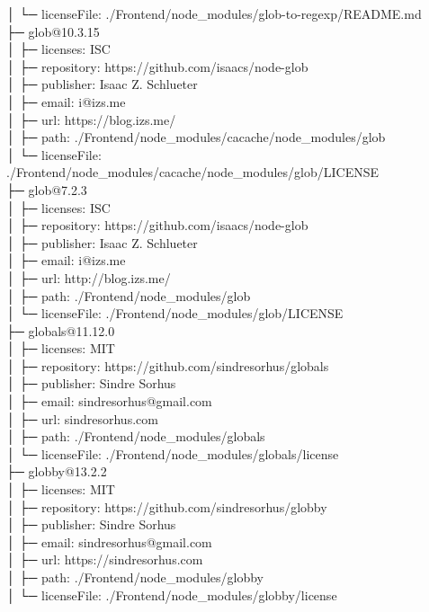 │  └─ licenseFile: ./Frontend/node\_modules/glob-to-regexp/README.md\\
├─ glob@10.3.15\\
│  ├─ licenses: ISC\\
│  ├─ repository: https://github.com/isaacs/node-glob\\
│  ├─ publisher: Isaac Z. Schlueter\\
│  ├─ email: i@izs.me\\
│  ├─ url: https://blog.izs.me/\\
│  ├─ path: ./Frontend/node\_modules/cacache/node\_modules/glob\\
│  └─ licenseFile: ./Frontend/node\_modules/cacache/node\_modules/glob/LICENSE\\
├─ glob@7.2.3\\
│  ├─ licenses: ISC\\
│  ├─ repository: https://github.com/isaacs/node-glob\\
│  ├─ publisher: Isaac Z. Schlueter\\
│  ├─ email: i@izs.me\\
│  ├─ url: http://blog.izs.me/\\
│  ├─ path: ./Frontend/node\_modules/glob\\
│  └─ licenseFile: ./Frontend/node\_modules/glob/LICENSE\\
├─ globals@11.12.0\\
│  ├─ licenses: MIT\\
│  ├─ repository: https://github.com/sindresorhus/globals\\
│  ├─ publisher: Sindre Sorhus\\
│  ├─ email: sindresorhus@gmail.com\\
│  ├─ url: sindresorhus.com\\
│  ├─ path: ./Frontend/node\_modules/globals\\
│  └─ licenseFile: ./Frontend/node\_modules/globals/license\\
├─ globby@13.2.2\\
│  ├─ licenses: MIT\\
│  ├─ repository: https://github.com/sindresorhus/globby\\
│  ├─ publisher: Sindre Sorhus\\
│  ├─ email: sindresorhus@gmail.com\\
│  ├─ url: https://sindresorhus.com\\
│  ├─ path: ./Frontend/node\_modules/globby\\
│  └─ licenseFile: ./Frontend/node\_modules/globby/license\\
